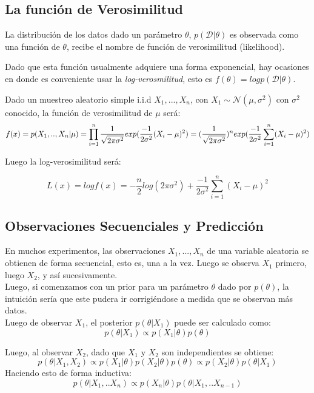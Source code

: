 \subsection{La función de Verosimilitud}

\begin{definition}
La distribución de los datos dado un parámetro $\theta$, $p(\mathcal{D}|\theta)$ es observada como una función de $\theta$, recibe el nombre de función de verosimilitud (likelihood). 
\label{función_verosimilitud}
\end{definition}

Dado que esta función usualmente adquiere una forma exponencial, hay ocasiones en donde es conveniente usar la \emph{log-verosmilitud}, esto es $f(\theta)=log p(\mathcal{D}|\theta)$.

\begin{example}
Dado un muestreo aleatorio simple i.i.d $X_1,...,X_n$, con $X_1\sim \mathcal{N}(\mu,\sigma^2)$ con $\sigma^2$ conocido, la función  de verosimilitud de $\mu$ será:
$$
f(x)=p(X_1,..,X_n|\mu)=\prod_{i=1}^{n} \frac{1}{\sqrt{2 \pi \sigma^{2}}} 
exp(\frac{-1}{2\sigma^{2}}(X_i-\mu)^{2})\\
= (\frac{1}{\sqrt{2 \pi \sigma^{2}}})^{n} exp(\frac{-1}{2 \sigma^{2}} \sum_{i=1}^{n} (X_i - \mu )^{2})
$$

Luego la log-verosimilitud será:

$$
L(x)= log f(x) = -\frac{n}{2} log(2 \pi \sigma^{2}) + \frac{-1}{2\sigma^{2}} \sum_{i=1}^{n} (X_i - \mu )^{2}
$$

\end{example}

\subsection{Observaciones Secuenciales y Predicción}

En muchos experimentos, las observaciones $X_1,...,X_n$ de una variable aleatoria se obtienen de forma secuencial, esto es, una a la vez. Luego se observa $X_1$ primero, luego $X_2$, y así sucesivamente. \\
Luego, si comenzamos con un prior para un parámetro $\theta$ dado por $p(\theta)$, la intuición sería que este pudera ir corrigiéndose a medida que se observan más datos. \\
Luego de observar $X_1$, el posterior $p(\theta|X_1)$ puede ser calculado como: 
$$
p(\theta|X_1) \propto p(X_1|\theta) p(\theta)
$$

Luego, al observar $X_2$, dado que $X_1$ y $X_2$ son independientes se obtiene: 
$$
p(\theta | X_1,X_2) \propto p(X_1 |\theta) p(X_2|\theta) p(\theta) \propto 
p(X_2|\theta) p(\theta|X_1) 
$$
Haciendo esto de forma inductiva: 
$$
p(\theta | X_1,..X_n) \propto p(X_n|\theta) p(\theta|X_1,..X_{n-1}) 
$$

